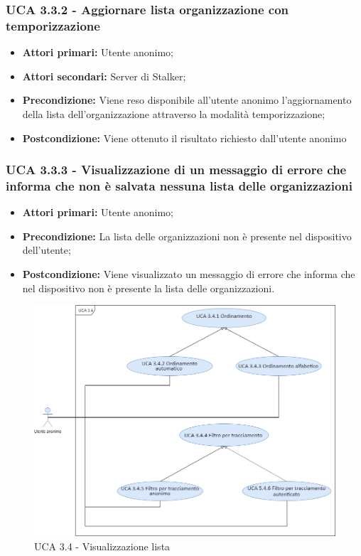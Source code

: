 \subsubsection{UCA 3.3.2 - Aggiornare lista organizzazione con temporizzazione}%
\begin{itemize} 
	\item \textbf{Attori primari:} Utente anonimo;
	\item \textbf{Attori secondari:} Server di Stalker;
	\item \textbf{Precondizione:} Viene reso disponibile all’utente anonimo l’aggiornamento della lista dell’organizzazione attraverso la modalità temporizzazione; 	
	\item \textbf{Postcondizione:} Viene ottenuto il risultato richiesto dall’utente anonimo
\end{itemize}

\subsubsection{UCA 3.3.3 - Visualizzazione di un messaggio di errore che informa che non è salvata nessuna lista delle organizzazioni}%
\begin{itemize}
	\item \textbf{Attori primari:} Utente anonimo;
	\item \textbf{Precondizione:} La lista delle organizzazioni non è presente nel dispositivo dell’utente;
	\item \textbf{Postcondizione:} Viene visualizzato un messaggio di errore che informa che nel dispositivo non è presente la lista delle organizzazioni.
\end{itemize}

\newpage
\begin{figure}[h]
	\centering
	\caption{UCA 3.4 - Visualizzazione lista}
	\includegraphics[scale=0.5]{sezioni/UseCase/Immagini/UCA3.4.png}
\end{figure}

